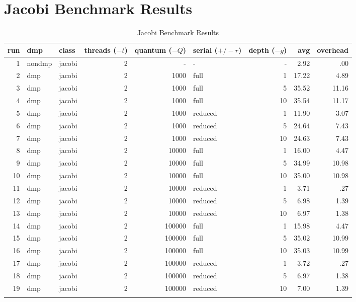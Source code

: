 \chapter{Jacobi Benchmark Results}

\begin{center}
\begin{small}
\begin{longtable}{rllrrlrrr}
\hline
run & dmp & class & threads ($-t$) & quantum ($-Q$) & serial ($+/-r$) & depth ($-g$) & avg & overhead\\
\hline
 1 & nondmp & jacobi & 2 & - & - & - & 2.92 & .00\\
 2 & dmp & jacobi & 2 & 1000 & full & 1 & 17.22 & 4.89\\
 3 & dmp & jacobi & 2 & 1000 & full & 5 & 35.52 & 11.16\\
 4 & dmp & jacobi & 2 & 1000 & full & 10 & 35.54 & 11.17\\
 5 & dmp & jacobi & 2 & 1000 & reduced & 1 & 11.90 & 3.07\\
 6 & dmp & jacobi & 2 & 1000 & reduced & 5 & 24.64 & 7.43\\
 7 & dmp & jacobi & 2 & 1000 & reduced & 10 & 24.63 & 7.43\\
 8 & dmp & jacobi & 2 & 10000 & full & 1 & 16.00 & 4.47\\
 9 & dmp & jacobi & 2 & 10000 & full & 5 & 34.99 & 10.98\\
10 & dmp & jacobi & 2 & 10000 & full & 10 & 35.00 & 10.98\\
11 & dmp & jacobi & 2 & 10000 & reduced & 1 & 3.71 & .27\\
12 & dmp & jacobi & 2 & 10000 & reduced & 5 & 6.98 & 1.39\\
13 & dmp & jacobi & 2 & 10000 & reduced & 10 & 6.97 & 1.38\\
14 & dmp & jacobi & 2 & 100000 & full & 1 & 15.98 & 4.47\\
15 & dmp & jacobi & 2 & 100000 & full & 5 & 35.02 & 10.99\\
16 & dmp & jacobi & 2 & 100000 & full & 10 & 35.03 & 10.99\\
17 & dmp & jacobi & 2 & 100000 & reduced & 1 & 3.72 & .27\\
18 & dmp & jacobi & 2 & 100000 & reduced & 5 & 6.97 & 1.38\\
19 & dmp & jacobi & 2 & 100000 & reduced & 10 & 7.00 & 1.39\\
\hline
\caption{Jacobi Benchmark Results}
\label{tab:jacobi_results}
\end{longtable}
\end{small}
\end{center}

